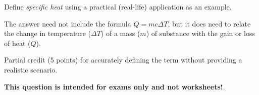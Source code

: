 

Define {\it specific heat} using a practical (real-life) application as an example.

\vskip 50pt







The answer need not include the formula $Q = mc \Delta T$, but it does need to relate the change in temperature ($\Delta T$) of a mass ($m$) of substance with the gain or loss of heat ($Q$).

\vskip 10pt

Partial credit (5 points) for accurately defining the term without providing a realistic scenario.







{\bf This question is intended for exams only and not worksheets!}.




